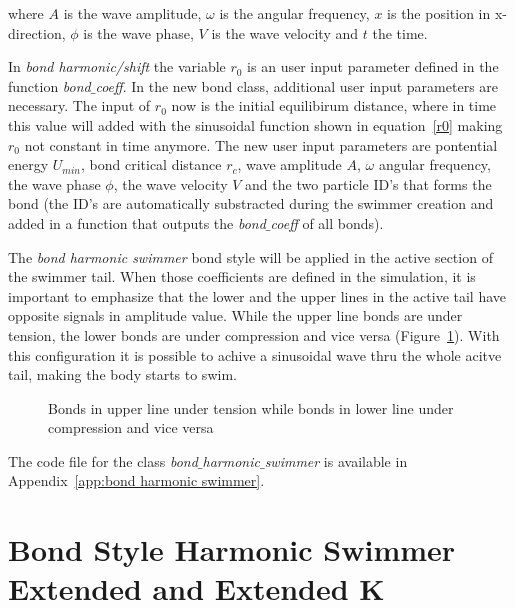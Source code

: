 where $A$ is the wave amplitude, $\omega$ is the angular frequency, $x$ is the position in x-direction, $\phi$ is the wave phase, $V$ is the wave velocity and $t$ the time.\par
In \textit{bond harmonic/shift} the variable $r_{0}$ is an user input parameter defined in the function \textit{bond$\_$coeff}. In the new bond class, additional user input parameters are 
necessary. The input of $r_{0}$ now is the initial equilibirum distance, where in time this value will added with the sinusoidal function shown in equation~\ref{r0} making $r_{0}$
not constant in time anymore. The new user input parameters are pontential energy $U_{min}$, bond critical distance $r_{c}$, wave amplitude $A$, $\omega$ angular frequency,
the wave phase $\phi$, the wave velocity $V$ and the two particle ID's that forms the bond (the ID's are automatically substracted during the swimmer creation and added in a function
that outputs the \textit{bond$\_$coeff} of all bonds).\par
The \textit{bond harmonic swimmer} bond style will be applied in the  active section of the swimmer tail. When those coefficients are defined in the simulation, it is important to
emphasize that the lower and the upper lines in the active tail have opposite signals in amplitude value. While the upper line bonds are under tension, the lower bonds are under 
compression and vice versa (Figure~\ref{fig:Bild3.4}). With this configuration it is possible to achive a sinusoidal wave thru the whole acitve tail, making the body starts to swim.


\begin{figure}[H]
\centering
  \begin{footnotesize}
  
  \caption[Bonds in upper line under tension while bonds in lower line under compression and vice versa]{Bonds in upper line under tension while bonds in lower line under compression and vice versa}
  \label{fig:Bild3.4}
  \end{footnotesize}
\end{figure} 

The code file for the class \textit{bond$\_$harmonic$\_$swimmer} is available in Appendix~\ref{app:bond harmonic swimmer}. 

\section{Bond Style Harmonic Swimmer Extended and Extended K}
\label{sec:section 4}

